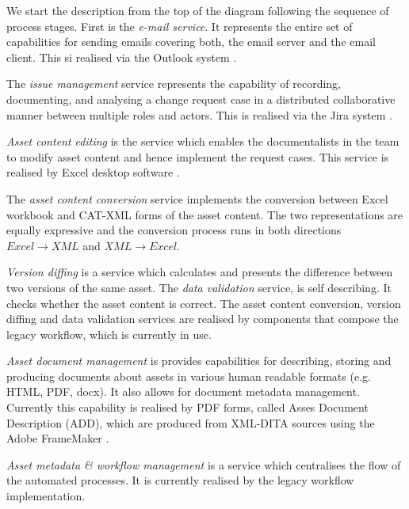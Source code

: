 
	We start the description from the top of the diagram following the sequence of process stages. First is the \textit{e-mail service}. It represents the entire set of capabilities for sending emails covering both, the email server and the email client. This si realised via the Outlook system \citep{outlook}. 
	
	The \textit{issue management} service represents the capability of recording, documenting, and analysing a change request case in a distributed collaborative manner between multiple roles and actors. This is realised via the Jira system \citep{jira}. 
	
	\textit{Asset content editing} is the service which enables the documentalists in the team to modify asset content and hence implement the request cases. This service is realised by Excel desktop software \citep{excel}.
	
	The \textit{asset content conversion} service implements the conversion between Excel workbook and CAT-XML forms of the asset content. The two representations are equally expressive and the conversion process runs in both directions $ Excel \rightarrow XML $ and $XML \rightarrow Excel $.
	
	\textit{Version diffing} is a service which calculates and presents the difference between two versions of the same asset. The \textit{data validation} service, is self describing. It checks whether the asset content is correct. The asset content conversion, version diffing and data validation services are realised by components that compose the legacy workflow, which is currently in use.
	
	\textit{Asset document management} is provides capabilities for describing, storing and producing documents about assets in various human readable formats (e.g. HTML, PDF, docx). It also allows for document metadata management. Currently this capability is realised by PDF forms, called Asses Document Description (ADD), which are produced from XML-DITA sources \citep{dita-day2005introduction, dita-spec} using the Adobe FrameMaker \citep{framemaker} . 
	
	\textit{Asset metadata \& workflow management} is a service which centralises the flow of the automated processes. It is currently realised by the legacy workflow implementation. 
	
